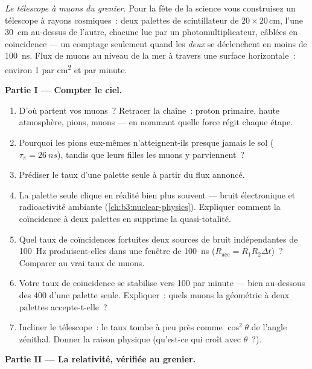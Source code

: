 \begin{problem}\label{pb:b3:particle-physics:1}
\emph{Le télescope à muons du grenier.} Pour la fête de la science
vous construisez un télescope à rayons cosmiques~: deux palettes de
scintillateur de $20\times20$\,\unit{cm}, l'une \qty{30}{cm} au-dessus
de l'autre, chacune lue par un photomultiplicateur, câblées en
coïncidence --- un comptage seulement quand les \emph{deux} se
déclenchent en moins de \qty{100}{ns}. Flux de muons au niveau de la
mer à travers une surface horizontale~: environ 1 par \unit{cm^2} et
par minute.

\medskip\noindent\textbf{Partie I --- Compter le ciel.}

\begin{enumerate}
  \item D'où partent vos muons~? Retracer la chaîne~: proton
        primaire, haute atmosphère, pions, muons --- en nommant
        quelle force régit chaque étape.
  \item Pourquoi les pions eux-mêmes n'atteignent-ils presque
        jamais le sol ($\tau_\pi = \qty{26}{ns}$), tandis que leurs
        filles les muons y parviennent~?
  \item Prédiser le taux d'une palette seule à partir du flux
        annoncé.
  \item La palette seule clique en réalité bien plus souvent ---
        bruit électronique et radioactivité ambiante
        (\cref{ch:b3:nuclear-physics}). Expliquer comment la
        coïncidence à deux palettes en supprime la quasi-totalité.
  \item Quel taux de coïncidences fortuites deux sources de bruit
        indépendantes de \qty{100}{Hz} produisent-elles dans une
        fenêtre de \qty{100}{ns} ($R_{\text{acc}} = R_1R_2\Delta t$)~?
        Comparer au vrai taux de muons.
  \item Votre taux de coïncidence se stabilise vers 100 par minute
        --- bien au-dessous des 400 d'une palette seule.
        Expliquer~: quels muons la géométrie à deux palettes
        accepte-t-elle~?
  \item Incliner le télescope~: le taux tombe à peu près comme
        $\cos^2\theta$ de l'angle zénithal. Donner la raison
        physique (qu'est-ce qui croît avec $\theta$~?).
\end{enumerate}

\medskip\noindent\textbf{Partie II --- La relativité, vérifiée au grenier.}


\end{problem}
